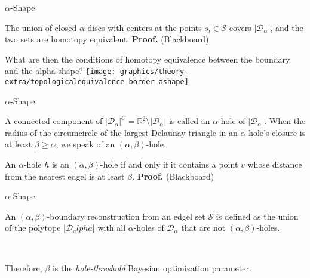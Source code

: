     \begin{frame}{$\alpha$-Shape}
         {
            \begin{lemma}
                The union of closed $\alpha$-discs with centers at the points $s_i \in \mathcal{S}$ covers $\lvert \mathcal{D}_\alpha \rvert$, and the two sets are homotopy equivalent.\newline
                \textbf{Proof.} (Blackboard)
            \end{lemma}
        }
         {
            What are then the conditions of homotopy equivalence between the boundary and the alpha shape?
        }
         {
            \texttt{[image: graphics/theory-extra/topologicalequivalence-border-ashape]}
        }
    \end{frame}

    \begin{frame}{$\alpha$-Shape}
         {
            \begin{definition}
                A connected component of $\lvert\mathcal{D}_\alpha\rvert^C = \mathbb{R}^2 \setminus \lvert \mathcal{D}_\alpha \rvert$ is called an $\alpha$-hole of $\lvert\mathcal{D}_\alpha\rvert$. When the radius of the circumcircle of the largest Delaunay triangle in an $\alpha$-hole’s closure is at least $\beta \geq \alpha$, we speak of an $\left(\alpha, \beta\right)$-hole.
            \end{definition}
        }
         {
            \begin{lemma}
                An $\alpha$-hole $h$ is an $\left(\alpha,\beta\right)$-hole if and only if it contains a point $v$ whose distance from the nearest edgel is at least $\beta$.\newline
                \textbf{Proof.} (Blackboard)
            \end{lemma}
        }
    \end{frame}

    \begin{frame}{$\alpha$-Shape}
         {
            \begin{definition}
                An $\left(\alpha,\beta\right)$-boundary reconstruction from an edgel set $\mathcal{S}$ is defined as the union of the polytope $\lvert\mathcal{D}_alpha\rvert$ with all $\alpha$-holes of $\mathcal{D}_\alpha$ that are not $\left(\alpha,\beta\right)$-holes.
            \end{definition}
        }
         {
            \begin{remark}
                Therefore, $\beta$ is the \textit{hole-threshold} Bayesian optimization parameter.
            \end{remark}
        }
    \end{frame}

